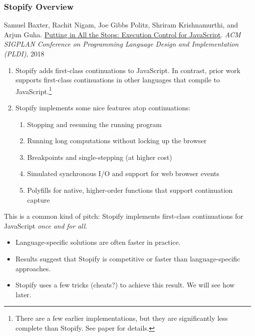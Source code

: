 \documentclass[8pt,pdf,handout]{beamer}
\begin{document}
\begin{frame}

\frametitle{Stopify Overview}

\begin{block}{}
Samuel Baxter, Rachit Nigam, Joe Gibbs Politz, Shriram Krishnamurthi, and Arjun
Guha. \href{https://arxiv.org/abs/1802.02974}{Putting in All the Stops:
Execution Control for JavaScript}. \emph{ACM SIGPLAN Conference on Programming
Language Design and Implementation (PLDI)}, 2018
\end{block}

\begin{enumerate}

\item Stopify adds first-class continuations to JavaScript. In contrast, prior work
supports first-class continuations in other languages that compile to
JavaScript.\footnote{There are a few earlier implementations, but they are
significantly less complete than Stopify. See paper for details.}

\pause

\item Stopify implements some nice features atop continuations:

\begin{enumerate}

\item Stopping and resuming the running program
\item Running long computations without locking up the browser
\item Breakpoints and single-stepping (at higher cost)
\item Simulated synchronous I/O and support for web browser events
\item Polyfills for native, higher-order functions that support continuation
      capture

\end{enumerate}

\end{enumerate}

\pause

\begin{alertblock}{This is a common kind of pitch:}
Stopify implements first-class continuations for
JavaScript \emph{once and for all}.
\end{alertblock}

\pause

\begin{itemize}

\item Language-specific solutions are often faster in practice.

\item Results suggest that Stopify is competitive or faster than
language-specific approaches.

\item Stopify uses a few tricks (cheats?) to achieve this result. We will
see how later.

\end{itemize}

\end{frame}
\end{document}
